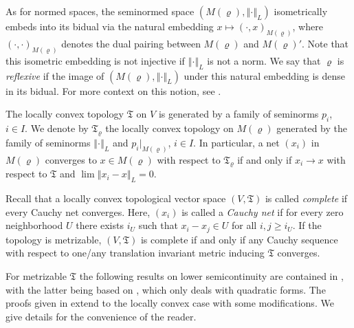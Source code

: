 \documentclass[a4paper,11pt,reqno]{amsart}
\theoremstyle{definition}
\numberwithin{equation}{section}
\newcommand{\vr}{{\varrho}}
\newcommand{\av}[1]{\left\Vert #1\right\Vert}
\newcommand{\1}{\mathds{1}}
\begin{document}
As for normed spaces, the seminormed space $(M(\vr),\av{\cdot}_L)$ isometrically embeds into its bidual via the natural embedding $x \mapsto (\cdot,x)_{M(\vr)}$, where  $(\cdot,\cdot)_{M(\vr)}$ denotes the dual pairing between $M(\vr)$ and $M(\vr)'$. Note that this isometric embedding is not injective if $\av{\cdot}_L$ is not a norm. We say that $\vr$ is {\em reflexive} if the image of $(M(\vr),\av{\cdot}_L)$ under this natural embedding is dense in its bidual.  For more context on this notion, see \cite[Appendix~A]{SZ25}. 

 
 
The locally convex topology $\mathfrak{T}$ on $V$ is generated by a family of seminorms $p_i$, $i \in I$. We denote by $\mathfrak{T}_\vr$ the locally convex topology on $M(\vr)$ generated by the family of seminorms $\av{\cdot}_L$ and $p_i|_{M(\vr)}$, $i \in I$. In particular, a net $(x_i)$ in $M(\vr)$ converges to $x \in M(\vr)$ with respect to $\mathfrak{T}_\vr$ if and only if $x_i \to x$ with respect to $\mathfrak{T}$ and $\lim \av{x_i - x}_L = 0$. 

Recall that a locally convex topological vector space $(V,\mathfrak{T})$ is called {\em complete} if every Cauchy net converges. Here, $(x_i)$ is called a {\em Cauchy net} if for every zero neighborhood $U$ there exists $i_U$ such that $x_i - x_j \in U$ for all $i,j \geq i_U$. If the topology is metrizable, $(V,\mathfrak{T})$ is complete if and only if any Cauchy sequence with respect to one/any translation invariant metric inducing $\mathfrak{T}$ converges.  



For metrizable $\mathfrak{T}$ the following results on lower semicontinuity are contained in \cite[Appendix~A]{SZ25}, with the latter being based on \cite{Schmi3}, which only deals with quadratic forms. The  proofs given in \cite{SZ25}  extend to the locally convex case with some modifications. We give details for the convenience of the reader.
\end{document}
